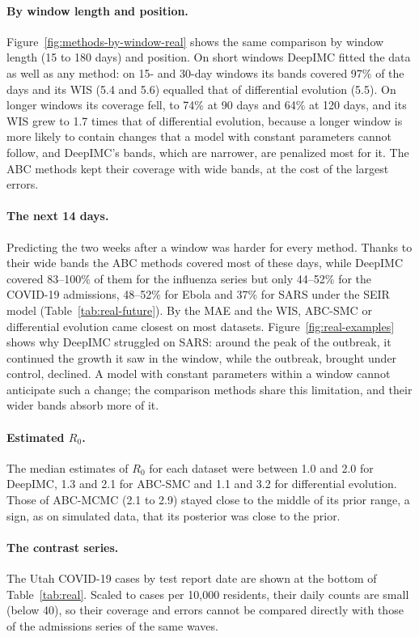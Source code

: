 \documentclass[12pt]{article}
\begin{document}
\paragraph{By window length and position.} Figure~\ref{fig:methods-by-window-real} shows the same comparison by
window length (15 to 180 days) and position. On short windows DeepIMC fitted the data as well as any method: on
15- and 30-day windows its bands covered 97\% of the days and its WIS (5.4 and 5.6) equalled that of differential
evolution (5.5). On longer windows its coverage fell, to 74\% at 90 days and 64\% at 120 days, and its WIS grew
to 1.7 times that of differential evolution, because a longer window is more likely to contain changes that a
model with constant parameters cannot follow, and DeepIMC's bands, which are narrower, are penalized most for
it. The ABC methods kept their coverage with wide bands, at the cost of the largest errors.

\paragraph{The next 14 days.} Predicting the two weeks after a window was harder for every method. Thanks to
their wide bands the ABC methods covered most of these days, while DeepIMC covered 83--100\% of them for the
influenza series but only 44--52\% for the COVID-19 admissions, 48--52\% for Ebola and 37\% for SARS under the
SEIR model (Table~\ref{tab:real-future}). By the MAE and the WIS, ABC-SMC or differential evolution came closest
on most datasets. Figure~\ref{fig:real-examples} shows why DeepIMC struggled on SARS: around the peak of the
outbreak, it continued the growth it saw in the window, while the outbreak, brought under control, declined. A
model with constant parameters within a window cannot anticipate such a change; the comparison methods share
this limitation, and their wider bands absorb more of it.

\paragraph{Estimated $R_0$.} The median estimates of $R_0$ for each dataset were between 1.0 and 2.0 for
DeepIMC, 1.3 and 2.1 for ABC-SMC and 1.1 and 3.2 for differential evolution. Those of ABC-MCMC (2.1 to 2.9)
stayed close to the middle of its prior range, a sign, as on simulated data, that its posterior was close to the
prior.

\paragraph{The contrast series.} The Utah COVID-19 cases by test report date are shown at the bottom of
Table~\ref{tab:real}. Scaled to cases per 10,000 residents, their daily counts are small (below 40), so
their coverage and errors cannot be compared directly with those of the admissions series of the same
waves.
\end{document}

